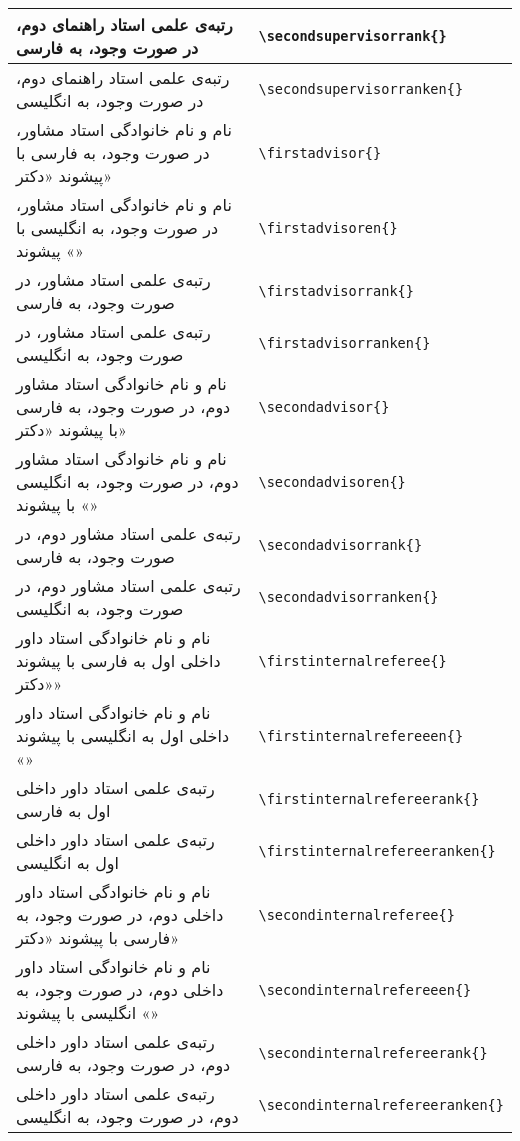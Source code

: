 \begin{longtable}[c]{| L{.45\textwidth} | R{.45\textwidth} |}
		رتبه‌ی علمی استاد راهنمای دوم، در صورت وجود، به فارسی &  \verb|\secondsupervisorrank{}| \\ \hline
		رتبه‌ی علمی استاد راهنمای دوم، در صورت وجود، به انگلیسی &  \verb|\secondsupervisorranken{}| \\ \hline
		نام و نام خانوادگی استاد مشاور، در صورت وجود، به فارسی با پیشوند «دکتر» &  \verb|\firstadvisor{}| \\ \hline
		نام و نام خانوادگی استاد مشاور، در صورت وجود، به انگلیسی با پیشوند «» &  \verb|\firstadvisoren{}| \\ \hline
		رتبه‌ی علمی استاد مشاور، در صورت وجود، به فارسی &  \verb|\firstadvisorrank{}| \\ \hline
		رتبه‌ی علمی استاد مشاور، در صورت وجود، به انگلیسی &  \verb|\firstadvisorranken{}| \\ \hline
		نام و نام خانوادگی استاد مشاور دوم، در صورت وجود، به فارسی با پیشوند «دکتر» &  \verb|\secondadvisor{}| \\ \hline
		نام و نام خانوادگی استاد مشاور دوم، در صورت وجود، به انگلیسی با پیشوند «» &  \verb|\secondadvisoren{}| \\ \hline
		رتبه‌ی علمی استاد مشاور دوم، در صورت وجود، به فارسی &  \verb|\secondadvisorrank{}| \\ \hline
		رتبه‌ی علمی استاد مشاور دوم، در صورت وجود، به انگلیسی &  \verb|\secondadvisorranken{}| \\ \hline
		نام و نام خانوادگی استاد داور داخلی اول به فارسی با پیشوند «دکتر» &  \verb|\firstinternalreferee{}| \\ \hline
		نام و نام خانوادگی استاد داور داخلی اول به انگلیسی با پیشوند «» &  \verb|\firstinternalrefereeen{}| \\ \hline
		رتبه‌ی علمی استاد داور داخلی اول به فارسی &  \verb|\firstinternalrefereerank{}| \\ \hline
		رتبه‌ی علمی استاد داور داخلی اول به انگلیسی &  \verb|\firstinternalrefereeranken{}| \\ \hline
		نام و نام خانوادگی استاد داور داخلی دوم، در صورت وجود، به فارسی با پیشوند «دکتر» &  \verb|\secondinternalreferee{}| \\ \hline
		نام و نام خانوادگی استاد داور داخلی دوم، در صورت وجود، به انگلیسی با پیشوند «» &  \verb|\secondinternalrefereeen{}| \\ \hline
		رتبه‌ی علمی استاد داور داخلی دوم، در صورت وجود، به فارسی &  \verb|\secondinternalrefereerank{}| \\ \hline
		رتبه‌ی علمی استاد داور داخلی دوم، در صورت وجود، به انگلیسی &  \verb|\secondinternalrefereeranken{}| \\ \hline

\end{longtable}
